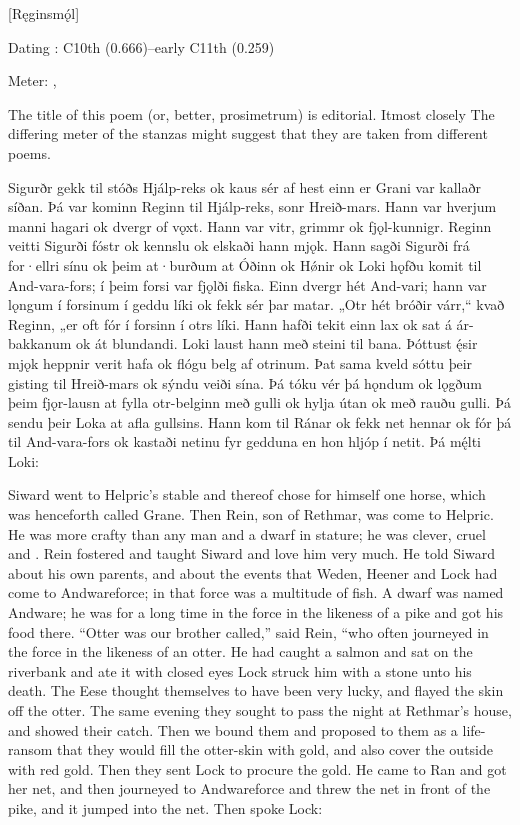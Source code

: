 [Ręginsmǫ́l]

\begin{flushright}%
Dating \parencite{Sapp2022}: C10th (0.666)–early C11th (0.259)

Meter: \Ljodahattr, \Fornyrdislag%
\end{flushright}

The title of this poem (or, better, prosimetrum) is editorial.  Itmost closely The differing meter of the stanzas might suggest that they are taken from different poems.

\sectionline

\bpg\bpa Sigurðr gekk til stóðs Hjálp-reks ok kaus sér af hest einn er Grani var kallaðr síðan. Þá var kominn Reginn til Hjálp-reks, sonr Hreið-mars. Hann var hverjum manni hagari ok dvergr of vǫxt. Hann var vitr, grimmr ok fjǫl-kunnigr. Reginn veitti Sigurði fóstr ok kennslu ok elskaði hann mjǫk. Hann sagði Sigurði frá for·ellri sínu ok þeim at·burðum at Óðinn ok Hǿnir ok Loki hǫfðu komit til And-vara-fors; í þeim forsi var fjǫlði fiska. Einn dvergr hét And-vari; hann var lǫngum í forsinum í geddu líki ok fekk sér þar matar. „Otr hét bróðir várr,“ kvað Reginn, „er oft fór í forsinn í otrs líki. Hann hafði tekit einn lax ok sat á ár-bakkanum ok át blundandi. Loki laust hann með steini til bana. Þóttust ę́sir mjǫk heppnir verit hafa ok flógu belg af otrinum. Þat sama kveld sóttu þeir gisting til Hreið-mars ok sýndu veiði sína. Þá tóku vér þá hǫndum ok lǫgðum þeim fjǫr-lausn at fylla otr-belginn með gulli ok hylja útan ok með rauðu gulli. Þá sendu þeir Loka at afla gullsins. Hann kom til Ránar ok fekk net hennar ok fór þá til And-vara-fors ok kastaði netinu fyr gedduna en hon hljóp í netit. Þá mę́lti Loki:\epa

\bpb Siward went to Helpric’s stable and thereof chose for himself one horse, which was henceforth called Grane. Then Rein, son of Rethmar, was come to Helpric. He was more crafty than any man and a dwarf in stature; he was clever, cruel and . Rein fostered and taught Siward and love him very much. He told Siward about his own parents, and about the events that Weden, Heener and Lock had come to Andwareforce; in that force was a multitude of fish. A dwarf was named Andware; he was for a long time in the force in the likeness of a pike and got his food there. “Otter was our brother called,” said Rein, “who often journeyed in the force in the likeness of an otter. He had caught a salmon and sat on the riverbank and ate it with closed eyes Lock struck him with a stone unto his death. The Eese thought themselves to have been very lucky, and flayed the skin off the otter. The same evening they sought to pass the night at Rethmar’s house, and showed their catch. Then we bound them and proposed to them as a life-ransom that they would fill the otter-skin with gold, and also cover the outside with red gold. Then they sent Lock to procure the gold. He came to Ran and got her net, and then journeyed to Andwareforce and threw the net in front of the pike, and it jumped into the net. Then spoke Lock:\epb\epg


